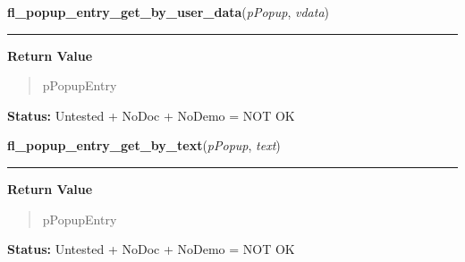    \label{xformslib:flpopup:fl_popup_entry_get_by_user_data}

    \vspace{0.5ex}

\hspace{.8\funcindent}\begin{boxedminipage}{\funcwidth}

    \raggedright \textbf{fl\_popup\_entry\_get\_by\_user\_data}(\textit{pPopup}, \textit{vdata})

    \vspace{-1.5ex}

    \rule{\textwidth}{0.5\fboxrule}
\setlength{\parskip}{2ex}
\setlength{\parskip}{1ex}
      \textbf{Return Value}
    \vspace{-1ex}

      \begin{quote}
      pPopupEntry

      \end{quote}

\textbf{Status:} Untested + NoDoc + NoDemo = NOT OK



    \end{boxedminipage}

    \label{xformslib:flpopup:fl_popup_entry_get_by_text}

    \vspace{0.5ex}

\hspace{.8\funcindent}\begin{boxedminipage}{\funcwidth}

    \raggedright \textbf{fl\_popup\_entry\_get\_by\_text}(\textit{pPopup}, \textit{text})

    \vspace{-1.5ex}

    \rule{\textwidth}{0.5\fboxrule}
\setlength{\parskip}{2ex}
\setlength{\parskip}{1ex}
      \textbf{Return Value}
    \vspace{-1ex}

      \begin{quote}
      pPopupEntry

      \end{quote}

\textbf{Status:} Untested + NoDoc + NoDemo = NOT OK



    \end{boxedminipage}

